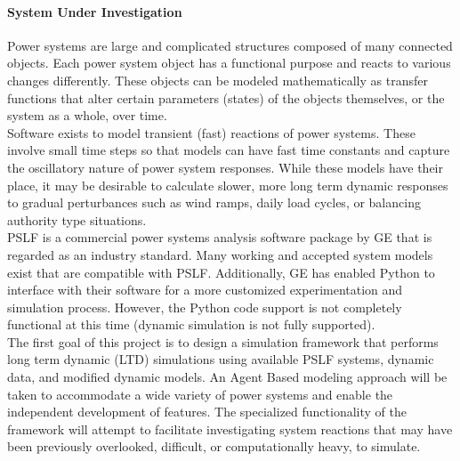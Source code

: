 \documentclass[12pt]{article}
\begin{document}
\paragraph{System Under Investigation}
Power systems are large and complicated structures composed of many connected objects. Each power system object has a functional purpose and reacts to various changes differently. These objects can be modeled mathematically as transfer functions that alter certain parameters (states) of the objects themselves, or the system as a whole, over time. \\

Software exists to model transient (fast) reactions of power systems. These involve small time steps so that models can have fast time constants and capture the oscillatory nature of power system responses. While these models have their place, it may be desirable to calculate slower, more long term dynamic responses to gradual perturbances such as wind ramps, daily load cycles, or balancing authority type situations. \\

PSLF is a commercial power systems analysis software package by GE that is regarded as an industry standard. Many working and accepted system models exist that are compatible with PSLF. Additionally, GE has enabled Python to interface with their software for a more customized experimentation and simulation process. However, the Python code support is not completely functional at this time (dynamic simulation is not fully supported).\\ %

The first goal of this project is to design a simulation framework that performs long term dynamic (LTD) simulations using available PSLF systems, dynamic data, and modified dynamic models. An Agent Based modeling approach will be taken to accommodate a wide variety of power systems and enable the independent development of features. 
The specialized functionality of the framework will attempt to facilitate investigating system reactions that may have been previously overlooked, difficult, or computationally heavy, to simulate.   \\
\end{document}
